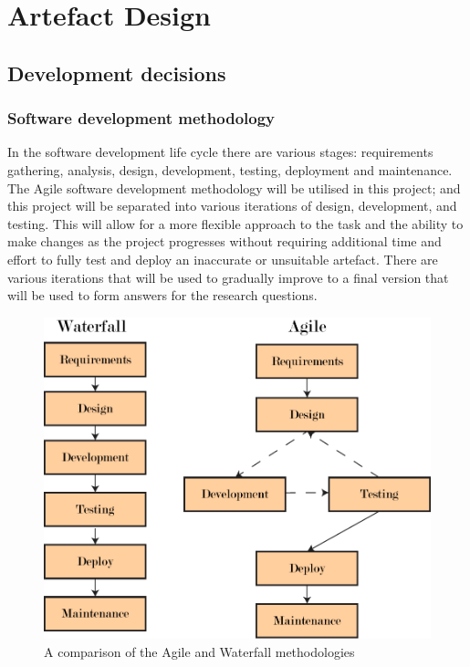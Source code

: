 \chapter{Artefact Design} \label{chap:artefact-design}
\section{Development decisions}
\subsection{Software development methodology}
In the software development life cycle there are various stages: requirements gathering, analysis, design,
development, testing, deployment and maintenance.\\
The Agile software development methodology will be utilised in this project; and this project will be separated
into various iterations of design, development, and testing. This will allow for a more flexible approach to
the task and the ability to make changes as the project progresses without requiring additional time and effort
to fully test and deploy an inaccurate or unsuitable artefact.
There are various iterations that will be used to gradually improve to a final version that will be used to
form answers for the research questions.
\begin{figure}
    \centering
    \includegraphics[width=\columnwidth]{figures/development_methodologies.pdf}
    \caption{A comparison of the Agile and Waterfall methodologies}
    \label{fig:development_methodologies}
\end{figure}
\FloatBarrier

